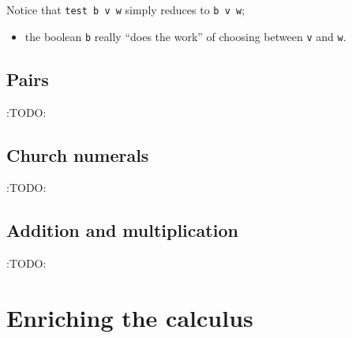 \documentclass[11pt]{article}
\theoremstyle{definition}
\begin{document}
Notice that \texttt{test b v w} simply reduces to \texttt{b v w};
\begin{itemize}
\item the boolean \texttt{b} really “does the work”
of choosing between \texttt{v} and \texttt{w}.
\end{itemize}

\subsection{Pairs}
\label{sec:org6ab3036}

:TODO:

\subsection{Church numerals}
\label{sec:orga3616f5}

:TODO:

\subsection{Addition and multiplication}
\label{sec:org7d982f4}

:TODO:

\section{Enriching the calculus}
\label{sec:orge4fd59a}

\section{}
\label{sec:orga760ca3}
\end{document}
